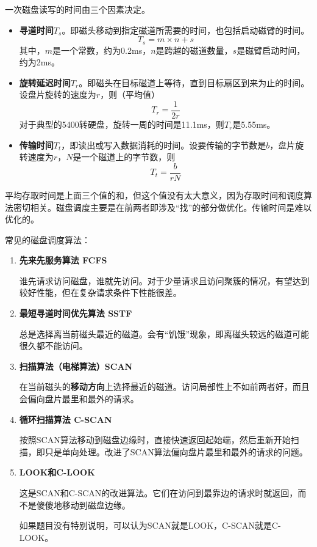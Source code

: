 \documentclass[12pt, a4paper, oneside]{ctexart}
\begin{document}
一次磁盘读写的时间由三个因素决定。
\begin{itemize}
  \item {\bf 寻道时间$T_s$}。即磁头移动到指定磁道所需要的时间，也包括启动磁臂的时间。
  \begin{equation*}
    T_s=m\times n+s
  \end{equation*}
  其中，$m$是一个常数，约为0.2ms，$n$是跨越的磁道数量，$s$是磁臂启动时间，约为2ms。

  \item {\bf 旋转延迟时间$T_r$}。即磁头在目标磁道上等待，直到目标扇区到来为止的时间。设盘片旋转的速度为$r$，则（平均值）
  \begin{equation*}
    T_r=\frac{1}{2r}
  \end{equation*}
  对于典型的5400转硬盘，旋转一周的时间是11.1ms，则$T_r$是5.55ms。

  \item {\bf 传输时间$T_t$}，即读出或写入数据消耗的时间。设要传输的字节数是$b$，盘片旋转速度为$r$，$N$是一个磁道上的字节数，则
  \begin{equation*}
    T_t=\frac{b}{rN}
  \end{equation*}
\end{itemize}

平均存取时间是上面三个值的和，但这个值没有太大意义，因为存取时间和调度算法密切相关。磁盘调度主要是在前两者即涉及“找”的部分做优化。传输时间是难以优化的。

常见的磁盘调度算法：
\begin{enumerate}
  \item {\bf 先来先服务算法 FCFS}
  
  谁先请求访问磁盘，谁就先访问。对于少量请求且访问聚簇的情况，有望达到较好性能，但在复杂请求条件下性能很差。

  \item {\bf 最短寻道时间优先算法 SSTF}
  
  总是选择离当前磁头最近的磁道。会有“饥饿”现象，即离磁头较远的磁道可能很久都不能访问。

  \item {\bf 扫描算法（电梯算法）SCAN}
  
  在当前磁头的\textbf{移动方向}上选择最近的磁道。访问局部性上不如前两者好，而且会偏向盘片最里和最外的请求。

  \item {\bf 循环扫描算法 C-SCAN}
  
  按照SCAN算法移动到磁盘边缘时，直接快速返回起始端，然后重新开始扫描，即只是单向处理。改进了SCAN算法偏向盘片最里和最外的请求的问题。

  \item {\bf LOOK和C-LOOK}
  
  这是SCAN和C-SCAN的改进算法。它们在访问到最靠边的请求时就返回，而不是傻傻地移动到磁盘边缘。

  如果题目没有特别说明，可以认为SCAN就是LOOK，C-SCAN就是C-LOOK。
\end{enumerate}
\end{document}
